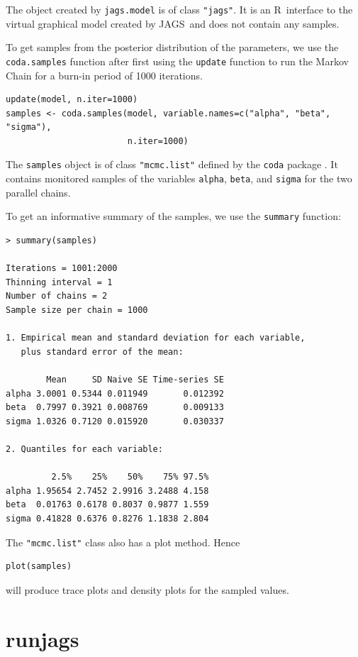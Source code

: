 \documentclass[11pt, a4paper, titlepage]{report}
\newcommand{\JAGS}{\textsf{JAGS}}
\newcommand{\R}{\textsf{R}}
\begin{document}
The object created by \texttt{jags.model} is of class \texttt{"jags"}. It is
an \R\ interface to the virtual graphical model created by \JAGS\ and does
not contain any samples.

To get samples from the posterior distribution of the parameters, we
use the \texttt{coda.samples} function after first using the
\texttt{update} function to run the Markov Chain for a burn-in period
of 1000 iterations.
\begin{verbatim}
update(model, n.iter=1000) 
samples <- coda.samples(model, variable.names=c("alpha", "beta", "sigma"), 
                        n.iter=1000)
\end{verbatim}
The \texttt{samples} object is of class \texttt{"mcmc.list"} defined by
the \texttt{coda} package \citep{PlummerEtal2005}. It contains
monitored samples of the variables \texttt{alpha}, \texttt{beta}, and
\texttt{sigma} for the two parallel chains.

To get an informative summary of the samples, we use the
\texttt{summary} function:
\begin{verbatim}
> summary(samples)

Iterations = 1001:2000
Thinning interval = 1 
Number of chains = 2 
Sample size per chain = 1000 

1. Empirical mean and standard deviation for each variable,
   plus standard error of the mean:

        Mean     SD Naive SE Time-series SE
alpha 3.0001 0.5344 0.011949       0.012392
beta  0.7997 0.3921 0.008769       0.009133
sigma 1.0326 0.7120 0.015920       0.030337

2. Quantiles for each variable:

         2.5%    25%    50%    75% 97.5%
alpha 1.95654 2.7452 2.9916 3.2488 4.158
beta  0.01763 0.6178 0.8037 0.9877 1.559
sigma 0.41828 0.6376 0.8276 1.1838 2.804
\end{verbatim}
The \texttt{"mcmc.list"} class also has a plot method. Hence
\begin{verbatim}
plot(samples)
\end{verbatim}
will produce trace plots and density plots for the sampled values.

\section{runjags}
\label{section:R:runjags}
\end{document}
